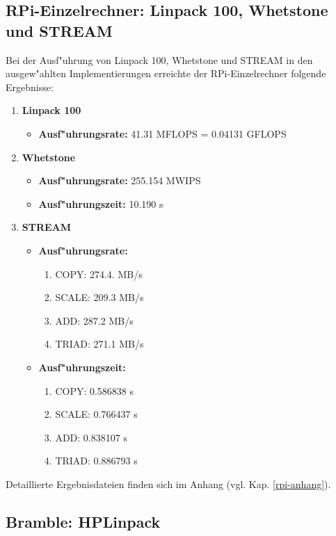 \subsection{RPi-Einzelrechner: Linpack 100, Whetstone und STREAM}\label{rpi-ergebnisse}

Bei der Ausf"uhrung von Linpack 100, Whetstone und STREAM in den ausgew"ahlten Implementierungen erreichte der RPi-Einzelrechner folgende Ergebnisse: 

\begin{enumerate}
	\item \textbf{Linpack 100} 
	\begin{itemize}
		\item \textbf{Ausf"uhrungsrate:} 41.31 MFLOPS = 0.04131 GFLOPS
	\end{itemize}
	\item \textbf{Whetstone} 
	\begin{itemize}
		\item \textbf{Ausf"uhrungsrate:} 255.154 MWIPS
		\item \textbf{Ausf"uhrungszeit:} 10.190 s  
	\end{itemize}
	\item \textbf{STREAM} 
	\begin{itemize}
		\item \textbf{Ausf"uhrungsrate:}
		\begin{enumerate}
			\item COPY: 274.4. MB/s
			\item SCALE: 209.3 MB/s
			\item ADD: 287.2 MB/s
			\item TRIAD: 271.1 MB/s
		\end{enumerate}					 
		\item \textbf{Ausf"uhrungszeit:}
		\begin{enumerate}
			\item COPY: 0.586838 s
			\item SCALE: 0.766437 s
			\item ADD: 0.838107 s
			\item TRIAD: 0.886793 s
		\end{enumerate}
	\end{itemize}
\end{enumerate} 
Detaillierte Ergebnisdateien finden sich im Anhang (vgl. Kap. \ref{rpi-anhang}). 
 
\subsection{Bramble: HPLinpack}\label{ergebnisse-hpl}

